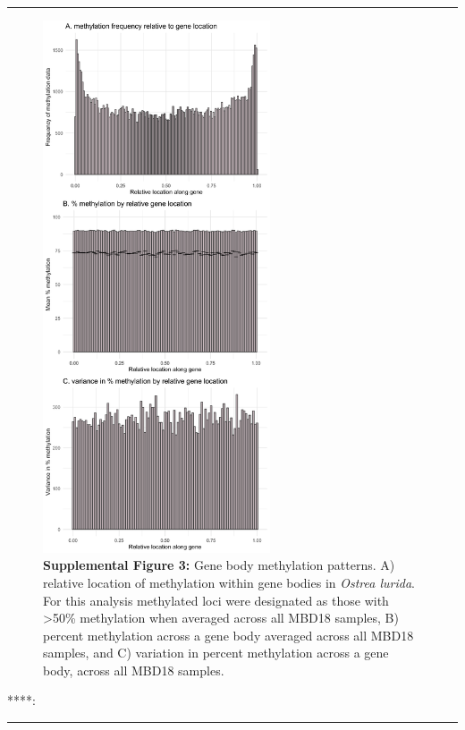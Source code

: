 \documentclass[
]{article}
\begin{document}
\begin{center}\rule{0.5\linewidth}{0.5pt}\end{center}

\begin{figure}
\centering
\includegraphics[width=0.6\textwidth,height=\textheight]{../supplemental-files/Supp-03.png}
\caption{\textbf{Supplemental Figure 3:} Gene body methylation patterns.
A) relative location of methylation within gene bodies in \emph{Ostrea
lurida}. For this analysis methylated loci were designated as those with
\textgreater50\% methylation when averaged across all MBD18 samples, B)
percent methylation across a gene body averaged across all MBD18
samples, and C) variation in percent methylation across a gene body,
across all MBD18 samples.}
\end{figure}

****:

\begin{center}\rule{0.5\linewidth}{0.5pt}\end{center}
\end{document}
